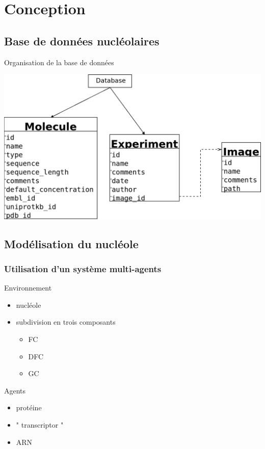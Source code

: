 \documentclass{beamer}
\begin{document}

\section{Conception}

\subsection{Base de données nucléolaires}

\begin{frame}
  \begin{block}{Organisation de la base de données}
  \begin{center}
    \includegraphics[width=0.9\columnwidth]{img/diagDB.png}
  \end{center}
  \end{block}
\end{frame}

\subsection{Modélisation du nucléole}

\begin{frame}
	\frametitle{Utilisation d'un système multi-agents}
	\begin{block}{Environnement}
		\begin{itemize}
			 \item nucléole
			 \item subdivision en trois composants
			 \begin{itemize}
			 	\item FC
			 	\item DFC
			 	\item GC
			\end{itemize}
		\end{itemize}
  	\end{block}
  	\begin{block}{Agents}
		\begin{itemize}
			 \item protéine
			 \item " transcriptor "
			 \item ARN
		\end{itemize}
  	\end{block}
\end{frame}
\end{document}
